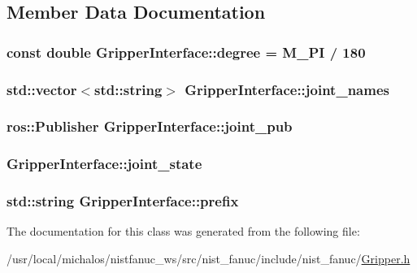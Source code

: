 \subsection{Member Data Documentation}
\hypertarget{classGripperInterface_ab3d004505c5be0bb95b5e0b4746a6119}{
\subsubsection[{degree}]{\setlength{\rightskip}{0pt plus 5cm}const double Gripper\-Interface\-::degree = M\-\_\-\-P\-I / 180}}\label{classGripperInterface_ab3d004505c5be0bb95b5e0b4746a6119}
\hypertarget{classGripperInterface_a2175efb34e767fddbeb230b4bd76d5d4}{
\subsubsection[{joint\-\_\-names}]{\setlength{\rightskip}{0pt plus 5cm}std\-::vector$<$std\-::string$>$ Gripper\-Interface\-::joint\-\_\-names}}\label{classGripperInterface_a2175efb34e767fddbeb230b4bd76d5d4}
\hypertarget{classGripperInterface_a1bd391402e2051e744063289506b6247}{
\subsubsection[{joint\-\_\-pub}]{\setlength{\rightskip}{0pt plus 5cm}ros\-::\-Publisher Gripper\-Interface\-::joint\-\_\-pub}}\label{classGripperInterface_a1bd391402e2051e744063289506b6247}
\hypertarget{classGripperInterface_a8c141d69172982d454e4d8bc11a77645}{
\subsubsection[{joint\-\_\-state}]{ Gripper\-Interface\-::joint\-\_\-state}}\label{classGripperInterface_a8c141d69172982d454e4d8bc11a77645}
\hypertarget{classGripperInterface_af8175e1d6b1bd3d25a285cc2063bfae3}{
\subsubsection[{prefix}]{\setlength{\rightskip}{0pt plus 5cm}std\-::string Gripper\-Interface\-::prefix}}\label{classGripperInterface_af8175e1d6b1bd3d25a285cc2063bfae3}


The documentation for this class was generated from the following file\-:\begin{DoxyCompactItemize}
\item 
/usr/local/michalos/nistfanuc\-\_\-ws/src/nist\-\_\-fanuc/include/nist\-\_\-fanuc/\hyperlink{Gripper_8h}{Gripper.\-h}\end{DoxyCompactItemize}
